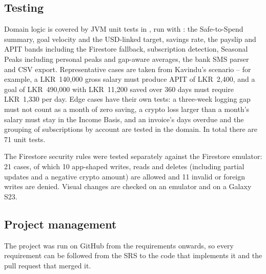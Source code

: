 \documentclass[11pt,a4paper]{article}
\newcommand{\lkr}[1]{LKR~#1}
\begin{document}
\subsection{Testing}
Domain logic is covered by JVM unit tests in , run with : the Safe-to-Spend summary, goal velocity and the USD-linked target, savings rate, the payslip and APIT bands including the Firestore fallback, subscription detection, Seasonal Peaks including personal peaks and gap-aware averages, the bank SMS parser and CSV export. Representative cases are taken from Kavindu's scenario -- for example, a \lkr{140,000} gross salary must produce APIT of \lkr{2,400}, and a goal of \lkr{490,000} with \lkr{11,200} saved over 360 days must require \lkr{1,330} per day. Edge cases have their own tests: a three-week logging gap must not count as a month of zero saving, a crypto loss larger than a month's salary must stay in the Income Basis, and an invoice's days overdue and the grouping of subscriptions by account are tested in the domain. In total there are 71 unit tests.

The Firestore security rules were tested separately against the Firestore emulator: 21 cases, of which 10 app-shaped writes, reads and deletes (including partial updates and a negative crypto amount) are allowed and 11 invalid or foreign writes are denied. Visual changes are checked on an emulator and on a Galaxy S23.

\subsection{Project management}
The project was run on GitHub from the requirements onwards, so every requirement can be followed from the SRS to the code that implements it and the pull request that merged it.
\end{document}
